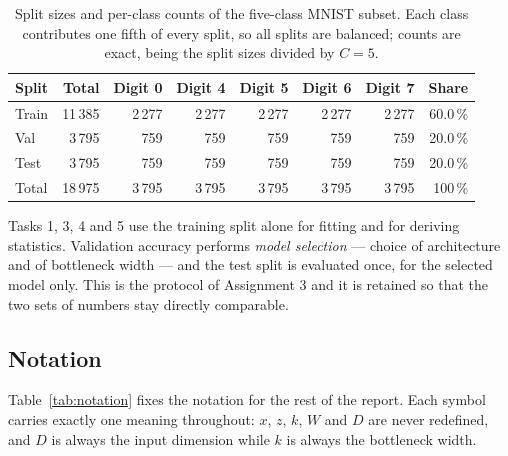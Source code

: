 \documentclass[11pt,a4paper]{article}
\begin{document}
\begin{table}[htbp]\centering
\caption{Split sizes and per-class counts of the five-class MNIST subset.  Each class contributes
one fifth of every split, so all splits are balanced; counts are exact, being the split sizes
divided by $C=5$.}\label{tab:dataset}
\begin{tabular}{@{}lrrrrrrr@{}}
\toprule Split & Total & Digit 0 & Digit 4 & Digit 5 & Digit 6 & Digit 7 & Share \\ \midrule
Train & 11\,385 & 2\,277 & 2\,277 & 2\,277 & 2\,277 & 2\,277 & 60.0\,\% \\
Val   & 3\,795  & 759    & 759    & 759    & 759    & 759    & 20.0\,\% \\
Test  & 3\,795  & 759    & 759    & 759    & 759    & 759    & 20.0\,\% \\ \midrule
Total & 18\,975 & 3\,795 & 3\,795 & 3\,795 & 3\,795 & 3\,795 & 100\,\% \\
\bottomrule
\end{tabular}
\end{table}

Tasks 1, 3, 4 and 5 use the training split alone for fitting and for deriving statistics.
Validation accuracy performs \emph{model selection} --- choice of architecture and of bottleneck
width --- and the test split is evaluated once, for the selected model only.  This is the protocol
of Assignment 3 and it is retained so that the two sets of numbers stay directly comparable.

\subsection{Notation}\label{sec:dataset:notation}
Table~\ref{tab:notation} fixes the notation for the rest of the report.  Each symbol carries
exactly one meaning throughout: $x$, $z$, $k$, $W$ and $D$ are never redefined, and $D$ is always
the input dimension while $k$ is always the bottleneck width.
\end{document}
